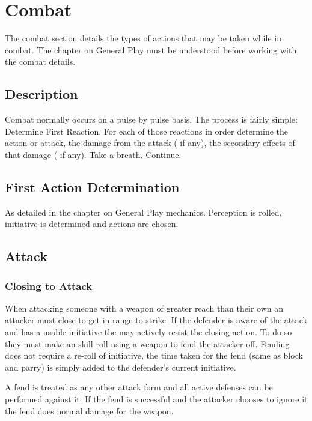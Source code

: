\chapter{Combat}

The combat section details the types of actions that may be taken
while in combat. The chapter on General Play must be understood before working with the combat details.

\section{Description}

Combat normally occurs on a pulse by pulse basis. The process is
fairly simple: Determine First Reaction. For each of those reactions in
order determine the action or attack, the damage from the attack ( if
any), the secondary effects of that damage ( if any). Take a breath.
Continue.

\section{First Action Determination}

As detailed in the chapter on General Play mechanics. Perception
is rolled, initiative is determined and actions are chosen.

\section{Attack}

\subsection{Closing to Attack}

When attacking someone with a weapon of greater reach than their own an
attacker must close to get in range to strike. If the defender is aware
of the attack and has a usable initiative the may actively resist the
closing action. To do so they must make an skill roll using a weapon to
fend the attacker off. Fending does not require a re-roll of initiative,
the time taken for the fend (same as block and parry) is simply added to
the defender's current initiative.

A fend is treated as any other attack form and all active defenses can be
performed against it. If the fend is successful and the attacker chooses
to ignore it the fend does normal damage for the weapon.

